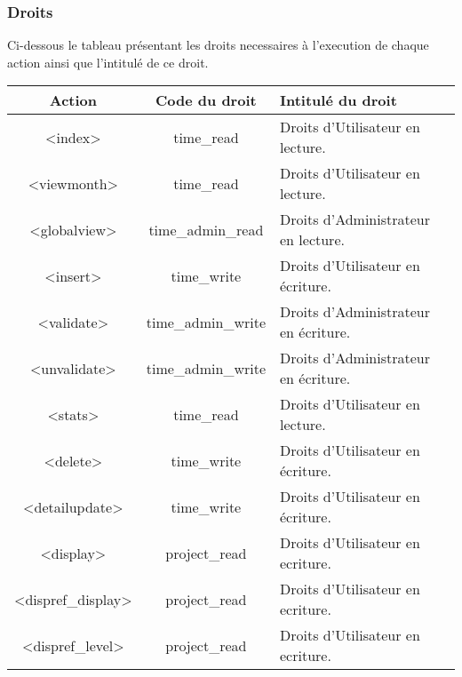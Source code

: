 \clearpage

\subsubsection{Droits}

Ci-dessous le tableau présentant les droits necessaires à l'execution de chaque action ainsi que l'intitulé de ce droit. \\
\begin{tabular}{|c|c|l|}
 \hline
 \textbf{Action} & \textbf{Code du droit} & \textbf{Intitulé du droit}\\
 \hline
 \hline
  <index> & time\_read & Droits d'Utilisateur en lecture. \\ 
 \hline
  <viewmonth> & time\_read & Droits d'Utilisateur en lecture. \\ 
 \hline
  <globalview> & time\_admin\_read & Droits d'Administrateur en lecture. \\ 
 \hline
  <insert> & time\_write & Droits d'Utilisateur en écriture. \\
 \hline
  <validate> & time\_admin\_write & Droits d'Administrateur en écriture. \\
 \hline
  <unvalidate> & time\_admin\_write & Droits d'Administrateur en écriture. \\
 \hline
  <stats> & time\_read & Droits d'Utilisateur en lecture. \\ 
 \hline
  <delete> & time\_write & Droits d'Utilisateur en écriture. \\ 
 \hline
  <detailupdate> & time\_write & Droits d'Utilisateur en écriture. \\ 
 \hline
  <display> & project\_read & Droits d'Utilisateur en ecriture. \\
 \hline
  <dispref\_display> & project\_read & Droits d'Utilisateur en ecriture. \\
 \hline
  <dispref\_level> & project\_read & Droits d'Utilisateur en ecriture. \\
 \hline
\end{tabular}

